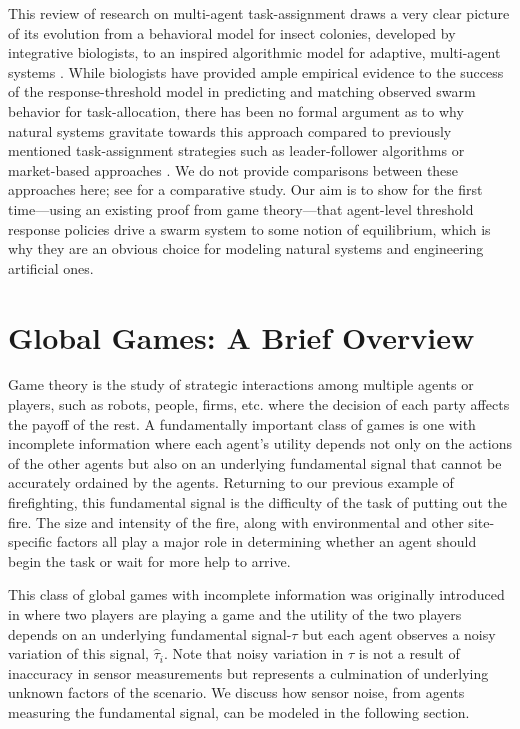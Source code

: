 \documentclass[conference]{ieeeconf}
\def\estt{\hat{\tau}}
\begin{document}
This review of research on multi-agent task-assignment draws a very clear picture of its evolution from a behavioral model for insect colonies, developed by integrative biologists, to an inspired algorithmic model for adaptive, multi-agent systems \cite{Krieger2000}. While biologists have provided ample empirical evidence to the success of the response-threshold model in predicting and matching observed swarm behavior for task-allocation, there has been no formal argument as to why natural systems gravitate towards this approach compared to previously mentioned task-assignment strategies such as leader-follower algorithms \cite{Chen2011} or market-based approaches \cite{Amstutz2008,Vig2007}. We do not provide comparisons between these approaches here; see \cite{Kalra2006} for a comparative study. Our aim is to show for the first time---using an existing proof from game theory\cite{Carlsson1993}---that agent-level threshold response policies drive a swarm system to some notion of equilibrium, which is why they are an obvious choice for modeling natural systems and engineering artificial ones.

\section{Global Games: A Brief Overview}\label{sec:ggoverview}
Game theory is the study of strategic interactions among multiple agents or players, such as robots, people, firms, etc. where the decision of each party affects the payoff of the rest. A fundamentally important class of games is one with incomplete information where each agent's utility depends not only on the actions of the other agents but also on an underlying fundamental signal that cannot be accurately ordained by the agents. Returning to our previous example of firefighting, this fundamental signal is the difficulty of the task of putting out the fire. The size and intensity of the fire, along with environmental and other site-specific factors all play a major role in determining whether an agent should begin the task or wait for more help to arrive. 

This class of global games with incomplete information was originally introduced in \cite{Carlsson1993} where two players are playing a game and the utility of the two players depends on an underlying fundamental signal-$\tau$ but each agent observes a noisy variation of this signal, $\estt_i$. Note that noisy variation in $\tau$ is not a result of inaccuracy in sensor measurements but represents a culmination of underlying unknown factors of the scenario. We discuss how sensor noise, from agents measuring the fundamental signal, can be modeled in the following section.
\end{document}
